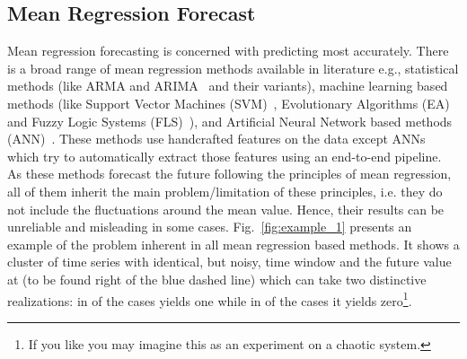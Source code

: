 \documentclass{ieeeaccess}
\begin{document}
\subsection{Mean Regression Forecast}
Mean regression forecasting is concerned with predicting  most accurately. There is a broad range of mean regression methods available in literature e.g., statistical methods (like ARMA and ARIMA~\cite{Box1990TSA574978} and their variants), machine learning based methods (like Support Vector Machines (SVM)~\cite{yan2013comparison,yan2014mid,rubio2011heuristic,vapnik1998statistical,frohlich2003feature,huang2006ga}, Evolutionary Algorithms (EA)~\cite{cortez2001genetic,frohlich2003feature,huang2006ga,gan2012hybrid,kim2000genetic,cai2013novel,bas2014modified} and Fuzzy Logic Systems (FLS)~\cite{chu1996application,song1995new,egrioglu2013fuzzy,cai2013novel,bas2014modified,shah2012fuzzy,aladag2012new}), and Artificial Neural Network based  methods (ANN)~\cite{assaad2008new,ogunmolu2016nonlinear,dorffner1996neural,malhotra2015long}. These methods use handcrafted features on the data except ANNs which try to automatically extract those features using an end-to-end pipeline. As these methods forecast the future following the principles of mean regression, all of them inherit the main problem/limitation of these principles, i.e. they do not include the fluctuations around the mean value. Hence, their results can be unreliable and misleading in some cases. Fig.~\ref{fig:example_1} presents an example of the problem inherent in all mean regression based methods. It shows a cluster of time series with identical, but noisy, time window  and the future value at  (to be found right of the blue dashed line) which can take two distinctive realizations: in  of the cases  yields one while in  of the cases it yields zero\footnote{If you like you may imagine this as an experiment on a chaotic system.}.
\end{document}
